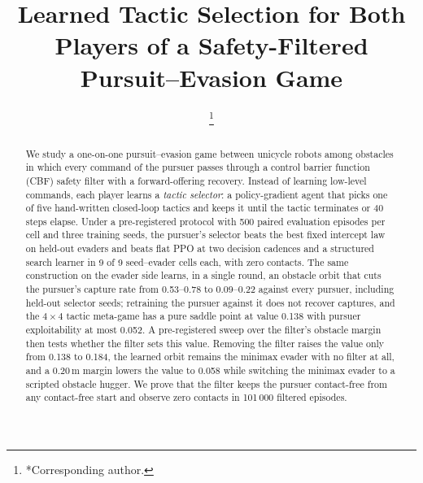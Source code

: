 \documentclass[conference]{IEEEtran}
\begin{document}
\title{Learned Tactic Selection for Both Players of a Safety-Filtered Pursuit--Evasion Game}

\author{%
\and
{}
\thanks{*Corresponding author.}}

\maketitle

\begin{abstract}
We study a one-on-one pursuit--evasion game between unicycle robots among obstacles in which every command of the pursuer passes through a control barrier function (CBF) safety filter with a forward-offering recovery. Instead of learning low-level commands, each player learns a \emph{tactic selector}: a policy-gradient agent that picks one of five hand-written closed-loop tactics and keeps it until the tactic terminates or 40 steps elapse. Under a pre-registered protocol with 500 paired evaluation episodes per cell and three training seeds, the pursuer's selector beats the best fixed intercept law on held-out evaders and beats flat PPO at two decision cadences and a structured search learner in 9 of 9 seed--evader cells each, with zero contacts. The same construction on the evader side learns, in a single round, an obstacle orbit that cuts the pursuer's capture rate from 0.53--0.78 to 0.09--0.22 against every pursuer, including held-out selector seeds; retraining the pursuer against it does not recover captures, and the $4\times4$ tactic meta-game has a pure saddle point at value 0.138 with pursuer exploitability at most 0.052. A pre-registered sweep over the filter's obstacle margin then tests whether the filter sets this value. Removing the filter raises the value only from 0.138 to 0.184, the learned orbit remains the minimax evader with no filter at all, and a 0.20\,m margin lowers the value to 0.058 while switching the minimax evader to a scripted obstacle hugger. We prove that the filter keeps the pursuer contact-free from any contact-free start and observe zero contacts in 101\,000 filtered episodes.
\end{abstract}
\end{document}
